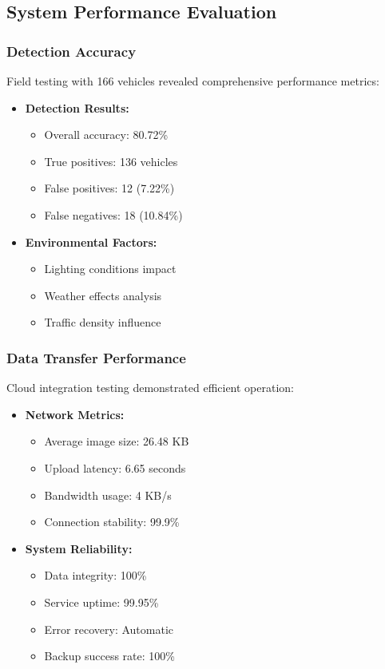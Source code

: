 \subsection{System Performance Evaluation}

\subsubsection{Detection Accuracy}
Field testing with 166 vehicles revealed comprehensive performance metrics:

\begin{itemize}
  \item \textbf{Detection Results:}
  \begin{itemize}
    \item Overall accuracy: 80.72\%
    \item True positives: 136 vehicles
    \item False positives: 12 (7.22\%)
    \item False negatives: 18 (10.84\%)
  \end{itemize}
  
  \item \textbf{Environmental Factors:}
  \begin{itemize}
    \item Lighting conditions impact
    \item Weather effects analysis
    \item Traffic density influence
  \end{itemize}
\end{itemize}

\subsubsection{Data Transfer Performance}
Cloud integration testing demonstrated efficient operation:

\begin{itemize}
  \item \textbf{Network Metrics:}
  \begin{itemize}
    \item Average image size: 26.48 KB
    \item Upload latency: 6.65 seconds
    \item Bandwidth usage: 4 KB/s
    \item Connection stability: 99.9\%
  \end{itemize}
  
  \item \textbf{System Reliability:}
  \begin{itemize}
    \item Data integrity: 100\%
    \item Service uptime: 99.95\%
    \item Error recovery: Automatic
    \item Backup success rate: 100\%
  \end{itemize}
\end{itemize}

